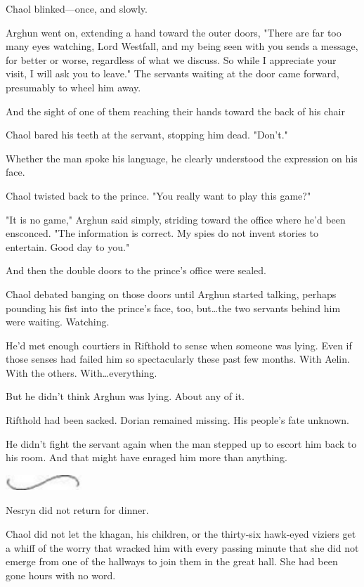 Chaol blinked---once, and slowly.

Arghun went on, extending a hand toward the outer doors, "There are far too many eyes watching, Lord Westfall, and my being seen with you sends a message, for better or worse, regardless of what we discuss.
So while I appreciate your visit, I will ask you to leave."
The servants waiting at the door came forward, presumably to wheel him away.

And the sight of one of them reaching their hands toward the back of his chair 

Chaol bared his teeth at the servant, stopping him dead.
"Don't."

Whether the man spoke his language, he clearly understood the expression on his face.

Chaol twisted back to the prince.
"You really want to play this game?"

"It is no game," Arghun said simply, striding toward the office where he'd been ensconced.
"The information is correct.
My spies do not invent stories to entertain.
Good day to you."

And then the double doors to the prince's office were sealed.

Chaol debated banging on those doors until Arghun started talking, perhaps pounding his fist into the prince's face, too, but\ldots the two servants behind him were waiting.
Watching.

He'd met enough courtiers in Rifthold to sense when someone was lying.
Even if those senses had failed him so spectacularly these past few months.
With Aelin.
With the others.
With\ldots everything.

But he didn't think Arghun was lying.
About any of it.

Rifthold had been sacked.
Dorian remained missing.
His people's fate unknown.

He didn't fight the servant again when the man stepped up to escort him back to his room.
And that might have enraged him more than anything.

\begin{center}
\includegraphics[width=1.12in,height=0.24in]{images/seperator}
\end{center}

Nesryn did not return for dinner.

Chaol did not let the khagan, his children, or the thirty-six hawk-eyed viziers get a whiff of the worry that wracked him with every passing minute that she did not emerge from one of the hallways to join them in the great hall.
She had been gone hours with no word.


